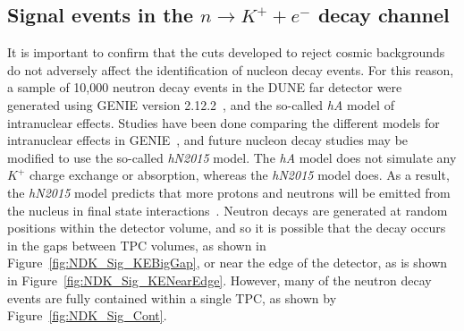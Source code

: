 \subsection{Signal events in the $n \rightarrow K^{+} + e^{-}$ decay channel} \label{sec:NDKSig}
It is important to confirm that the cuts developed to reject cosmic backgrounds do not adversely affect the identification of nucleon decay events. For this reason, a sample of 10,000 neutron decay events in the DUNE far detector were generated using GENIE version 2.12.2~\citep{GENIE}, and the so-called \emph{hA} model of intranuclear effects. Studies have been done comparing the different models for intranuclear effects in GENIE~\citep{FDTFMarch2017}, and future nucleon decay studies may be modified to use the so-called \emph{hN2015} model. The \emph{hA} model does not simulate any $K^+$ charge exchange or absorption, whereas the \emph{hN2015} model does. As a result, the \emph{hN2015} model predicts that more protons and neutrons will be emitted from the nucleus in final state interactions~\citep{FDTFMarch2017}. Neutron decays are generated at random positions within the detector volume, and so it is possible that the decay occurs in the gaps between TPC volumes, as shown in Figure~\ref{fig:NDK_Sig_KEBigGap}, or near the edge of the detector, as is shown in Figure~\ref{fig:NDK_Sig_KENearEdge}. However, many of the neutron decay events are fully contained within a single TPC, as shown by Figure~\ref{fig:NDK_Sig_Cont}. \\

